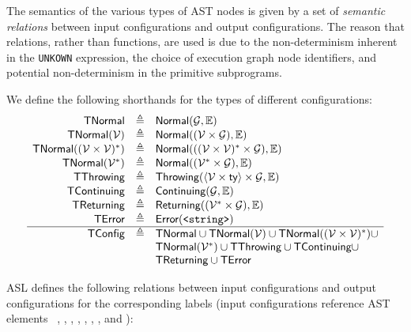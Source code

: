 \documentclass{book}
\newcommand\XGraphs[0]{\mathcal{G}}
\newcommand\vals[0]{\mathcal{V}}
\newcommand\Normal[0]{\textsf{Normal}}
\newcommand\Throwing[0]{\textsf{Throwing}}
\newcommand\Continuing[0]{\textsf{Continuing}}
\newcommand\Returning[0]{\textsf{Returning}}
\newcommand\Error[0]{\textsf{Error}}
\begin{document}
The semantics of the various types of AST nodes is given by a set of \emph{semantic relations} between
input configurations and output configurations.
The reason that relations, rather than functions, are used is due to the
non-determinism inherent in the \texttt{UNKOWN} expression,
the choice of execution graph node identifiers,
and potential non-determinism in the primitive subprograms.

\newcommand\TError[0]{\textsf{TError}}
\newcommand\TNormal[0]{\textsf{TNormal}}
\newcommand\TThrowing[0]{\textsf{TThrowing}}
\newcommand\TContinuing[0]{\textsf{TContinuing}}
\newcommand\TReturning[0]{\textsf{TReturning}}
\newcommand\TConfig[0]{\textsf{TConfig}}
We define the following shorthands for the types of different configurations:
\[
  \begin{array}{rcl}
    \TNormal        &\triangleq& \Normal(\XGraphs, \envs)\\
    \TNormal(\vals)   &\triangleq& \Normal((\vals \times \XGraphs), \envs)\\
    \TNormal((\vals \times \vals)^*)   &\triangleq& \Normal(((\vals \times \vals)^* \times \XGraphs), \envs)\\
    \TNormal(\vals^*) &\triangleq& \Normal((\vals^* \times \XGraphs), \envs)\\
    \TThrowing        &\triangleq& \Throwing(\langle\vals \times \ty\rangle \times \XGraphs, \envs)\\
    \TContinuing      &\triangleq& \Continuing(\XGraphs, \envs)\\
    \TReturning       &\triangleq& \Returning((\vals^* \times \XGraphs), \envs)\\
    \TError           &\triangleq& \Error(\texttt{<string>})\\
    \hline
    \TConfig          &\triangleq& \TNormal \cup \TNormal(\vals) \cup \TNormal((\vals \times \vals)^*) \cup \\
    & & \TNormal(\vals^*) \cup \TThrowing \cup \TContinuing \cup \\
    & & \TReturning \cup \TError
  \end{array}
\]

ASL defines the following relations between input configurations and output configurations
for the corresponding labels (input configurations reference AST elements~\cite{ASLAbstractSyntaxReference}
\expr, \lexpr, \stmt, \slice, \localdeclitem, \identifier, \fordirection, and \catcher):
\end{document}
